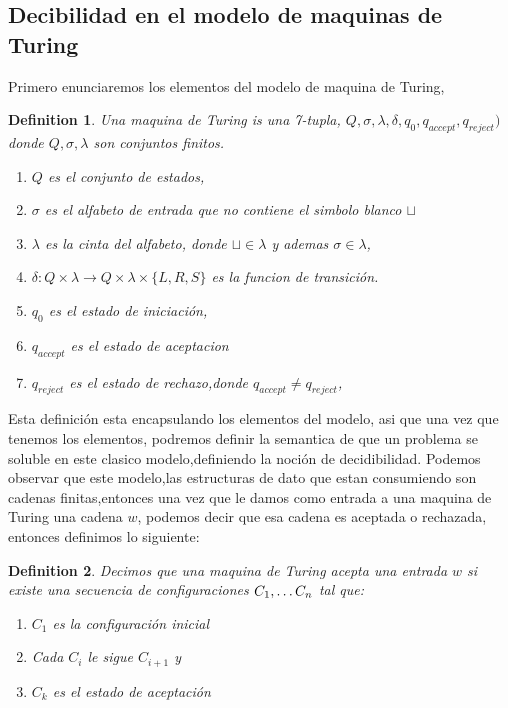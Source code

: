 \documentclass[10pt a4paper]{report}
\newtheorem*{definition}{Definition}
\begin{document}
    \subsection{Decibilidad en el modelo de maquinas de Turing}\label{subsec:decibilidad-en-el-modelo-de-maquinas-de-turing}
    Primero enunciaremos los elementos del modelo de maquina de Turing,
    \begin{definition}
        Una maquina de Turing is una 7-tupla, $Q,\sigma,\lambda,\delta,q_{0},q_{accept},q_{reject})$
        donde $Q,\sigma,\lambda$ son conjuntos finitos.
        \begin{enumerate}
            \item $Q$ es el conjunto de estados,
            \item $\sigma$ es el alfabeto de entrada que no contiene el simbolo blanco $\sqcup$
            \item $\lambda$ es la cinta del alfabeto, donde  $\sqcup\in\lambda$ y ademas $\sigma\in\lambda$,
            \item $\delta: Q\times\lambda \rightarrow Q\times\lambda\times\{L,R,S\}$ es la funcion de transición.
            \item $q_{0}$ es el estado de iniciación,
            \item $q_{accept}$ es el estado de aceptacion
            \item $q_{reject}$ es el estado de rechazo,donde $q_{accept} \neq q_{reject}$,

        \end{enumerate}

    \end{definition}
    Esta definición esta encapsulando los elementos del modelo,
    asi que una vez que tenemos los elementos, podremos definir la semantica
    de que un problema se soluble en este clasico modelo,definiendo
    la noción de decidibilidad.
    \space
    Podemos observar que este modelo,las estructuras de dato que estan consumiendo
    son cadenas finitas,entonces una vez que le damos como entrada a una maquina de
    Turing una cadena $w$, podemos decir que esa cadena es aceptada o rechazada,
    entonces definimos lo siguiente:
    \theoremstyle{Definición}
    \begin{definition}
        Decimos que una maquina de Turing acepta una entrada $w$ si existe una secuencia de configuraciones
        $C_{1},\mathellipsis C_{n}$ tal que:
        \begin{enumerate}
            \item $C_{1}$ es la configuración inicial
            \item Cada $C_{i}$ le sigue $C_{i+1}$ y
            \item $C_{k}$ es el estado de aceptación

        \end{enumerate}
    \end{definition}
\end{document}
